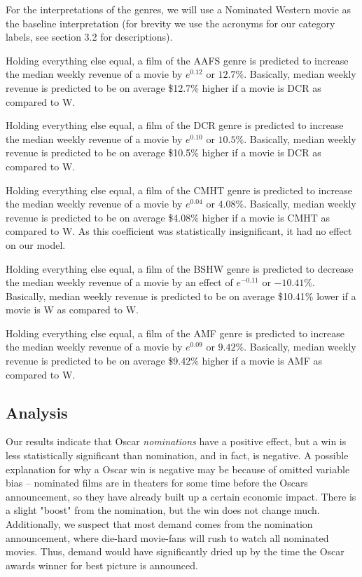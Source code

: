 \documentclass[11pt]{article} %
\begin{document}
\vspace{\baselineskip} 

For the interpretations of the genres, we will use a Nominated Western movie as the baseline interpretation (for brevity we use the acronyms for our category labels, see section 3.2 for descriptions).

Holding everything else equal, a film of the AAFS genre is predicted to increase the median weekly revenue of a movie by $e^{0.12}$ or $12.7\%$. Basically, median weekly revenue is predicted to be on average \$12.7\% higher if a movie is DCR as compared to W.

Holding everything else equal, a film of the DCR genre is predicted to increase the median weekly revenue of a movie by $e^{0.10}$ or $10.5\%$. Basically, median weekly revenue is predicted to be on average \$10.5\% higher if a movie is DCR as compared to W.

Holding everything else equal, a film of the CMHT genre is predicted to increase the median weekly revenue of a movie by $e^{0.04}$ or $4.08\%$. Basically, median weekly revenue is predicted to be on average \$4.08\% higher if a movie is CMHT as compared to W. As this coefficient was statistically insignificant, it had no effect on our model.

Holding everything else equal, a film of the BSHW genre is predicted to decrease the median weekly revenue of a movie by an effect of $e^{-0.11}$ or $-10.41\%$. Basically, median weekly revenue is predicted to be on average \$10.41\% lower if a movie is W as compared to W.

Holding everything else equal, a film of the AMF genre is predicted to increase the median weekly revenue of a movie by $e^{0.09}$ or $9.42\%$. Basically, median weekly revenue is predicted to be on average \$9.42\% higher if a movie is AMF as compared to W.




\subsection{Analysis}

Our results indicate that Oscar \textit{nominations} have a positive effect, but a win is less statistically significant than nomination, and in fact, is negative. A possible explanation for why a Oscar win is negative may be because of omitted variable bias -- nominated films are in theaters for some time before the Oscars announcement, so they have already built up a certain economic impact. There is a slight "boost" from the nomination, but the win does not change much. Additionally, we suspect that most demand comes from the nomination announcement, where die-hard movie-fans will rush to watch all nominated movies. Thus, demand would have significantly dried up by the time the Oscar awards winner for best picture is announced.
\end{document}
